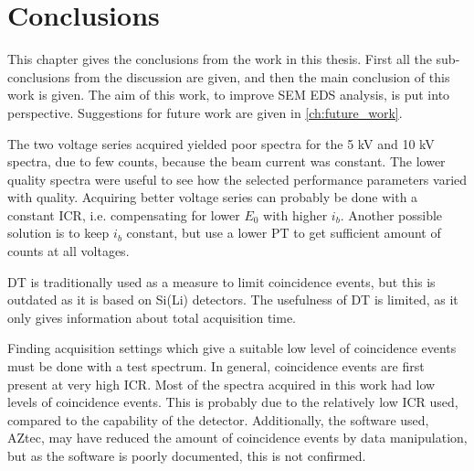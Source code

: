 \chapter{Conclusions}
\label{ch:conclusion}

This chapter gives the conclusions from the work in this thesis. 
First all the sub-conclusions from the discussion are given, and then the main conclusion of this work is given.
The aim of this work, to improve SEM EDS analysis, is put into perspective.
Suggestions for future work are given in \cref{ch:future_work}.











The two voltage series acquired yielded poor spectra for the 5 kV and 10 kV spectra, due to few counts, because the beam current was constant.
The lower quality spectra were useful to see how the selected performance parameters varied with quality.
Acquiring better voltage series can probably be done with a constant ICR, i.e. compensating for lower $E_0$ with higher $i_b$.
Another possible solution is to keep $i_b$ constant, but use a lower PT to get sufficient amount of counts at all voltages.

DT is traditionally used as a measure to limit coincidence events, but this is outdated as it is based on Si(Li) detectors.
The usefulness of DT is limited, as it only gives information about total acquisition time.

Finding acquisition settings which give a suitable low level of coincidence events must be done with a test spectrum.
In general, coincidence events are first present at very high ICR.
Most of the spectra acquired in this work had low levels of coincidence events.
This is probably due to the relatively low ICR used, compared to the capability of the detector.
Additionally, the software used, AZtec, may have reduced the amount of coincidence events by data manipulation, but as the software is poorly documented, this is not confirmed.



